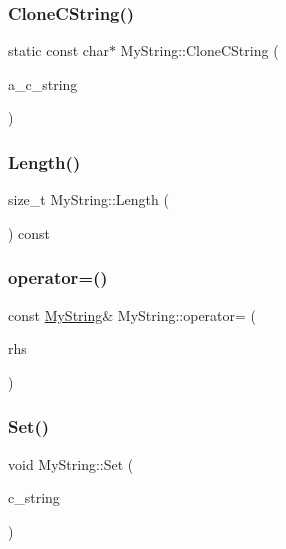 \subsubsection{\texorpdfstring{Clone\+C\+String()}{CloneCString()}}
{\footnotesize\ttfamily static const char$\ast$ My\+String\+::\+Clone\+C\+String (\begin{DoxyParamCaption}\item[{const char $\ast$}]{a\+\_\+c\+\_\+string }\end{DoxyParamCaption})\hspace{0.3cm}{\ttfamily [static]}}

\mbox{\label{classMyString_a4eb168b1ec401a732b3859abe004d648}} 
\subsubsection{\texorpdfstring{Length()}{Length()}}
{\footnotesize\ttfamily size\+\_\+t My\+String\+::\+Length (\begin{DoxyParamCaption}{ }\end{DoxyParamCaption}) const\hspace{0.3cm}{\ttfamily [inline]}}

\mbox{\label{classMyString_a0156d24764b9d8e4303763750f95cd38}} 
\subsubsection{\texorpdfstring{operator=()}{operator=()}}
{\footnotesize\ttfamily const \hyperlink{classMyString}{My\+String}\& My\+String\+::operator= (\begin{DoxyParamCaption}\item[{const \hyperlink{classMyString}{My\+String} \&}]{rhs }\end{DoxyParamCaption})\hspace{0.3cm}{\ttfamily [private]}}

\mbox{\label{classMyString_a521c4cd7eccac6ce554d8a51505e4970}} 
\subsubsection{\texorpdfstring{Set()}{Set()}}
{\footnotesize\ttfamily void My\+String\+::\+Set (\begin{DoxyParamCaption}\item[{const char $\ast$}]{c\+\_\+string }\end{DoxyParamCaption})}



